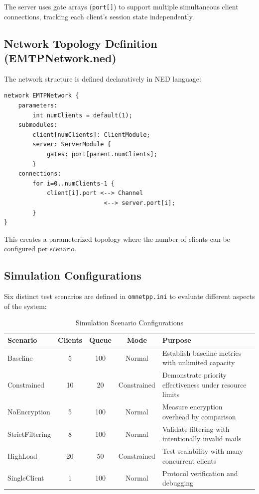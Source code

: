 \documentclass[12pt]{article}
\begin{document}
	The server uses gate arrays (\texttt{port[]}) to support multiple simultaneous client connections, tracking each client's session state independently.
	
	\subsection{Network Topology Definition (EMTPNetwork.ned)}
	
	The network structure is defined declaratively in NED language:
	
	\begin{verbatim}
network EMTPNetwork {
    parameters:
        int numClients = default(1);
    submodules:
        client[numClients]: ClientModule;
        server: ServerModule {
            gates: port[parent.numClients];
        }
    connections:
        for i=0..numClients-1 {
            client[i].port <--> Channel
                            <--> server.port[i];
        }
}
	\end{verbatim}
	
	This creates a parameterized topology where the number of clients can be configured per scenario.
	
	\subsection{Simulation Configurations}
	
	Six distinct test scenarios are defined in \texttt{omnetpp.ini} to evaluate different aspects of the system:
	
	\begin{table}[H]
		\centering
		\caption{Simulation Scenario Configurations}
		\label{tab:scenarios}
		\small
		\begin{tabular}{|l|c|c|c|p{4.5cm}|}
			\hline
			\textbf{Scenario} & \textbf{Clients} & \textbf{Queue} & \textbf{Mode} & \textbf{Purpose} \\
			\hline
			Baseline & 5 & 100 & Normal & Establish baseline metrics with unlimited capacity \\
			\hline
			Constrained & 10 & 20 & Constrained & Demonstrate priority effectiveness under resource limits \\
			\hline
			NoEncryption & 5 & 100 & Normal & Measure encryption overhead by comparison \\
			\hline
			StrictFiltering & 8 & 100 & Normal & Validate filtering with intentionally invalid mails \\
			\hline
			HighLoad & 20 & 50 & Constrained & Test scalability with many concurrent clients \\
			\hline
			SingleClient & 1 & 100 & Normal & Protocol verification and debugging \\
			\hline
		\end{tabular}
	\end{table}
	
\end{document}
